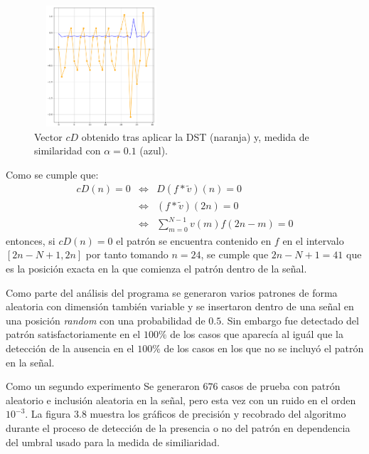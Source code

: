 \begin{figure}[h]
\center
\includegraphics[width=50mm,height=45mm]{Graphics/patternDetected1D.png}
\caption{Vector $cD$ obtenido tras aplicar la DST (naranja) y, medida de similaridad con $\alpha=0.1$ (azul).}
\end{figure}

\par Como se cumple que:
\begin{eqnarray}
cD(n)=0&\Leftrightarrow& D(f\ast\tilde{v})(n)=0\nonumber\\
&\Leftrightarrow&(f\ast\tilde{v})(2n)=0\nonumber\\
&\Leftrightarrow&\sum_{m=0}^{N-1}v(m)f(2n-m)=0\nonumber
\end{eqnarray}
entonces, si $cD(n)=0$ el patr\'on se encuentra contenido en $f$ en el intervalo $[2n-N+1,2n]$ por tanto tomando $n=24$, se cumple que $2n-N+1=41$ que es la posici\'on exacta en la que comienza el patr\'on dentro de la se\~nal.

\par Como parte del an\'alisis del programa se generaron varios patrones de forma aleatoria con dimensi\'on tambi\'en variable y se insertaron dentro de una se\~nal en una posici\'on \textit{random} con una probabilidad de $0.5$. Sin embargo fue detectado del patr\'on satisfactoriamente en el $100\%$ de los casos que aparec\'ia al igu\'al que la detecci\'on de la ausencia en el $100\%$ de los casos en los que no se incluy\'o el patr\'on en la se\~nal.\\

\par Como un segundo experimento Se generaron $676$ casos de prueba con patr\'on aleatorio e inclusi\'on aleatoria en la se\~nal, pero esta vez con un ruido en el orden $10^{-3}$.  La figura 3.8 muestra los gr\'aficos de precisi\'on y recobrado del algoritmo durante el proceso de detecci\'on de la presencia o no del patr\'on en dependencia del umbral usado para la medida de similiaridad.

